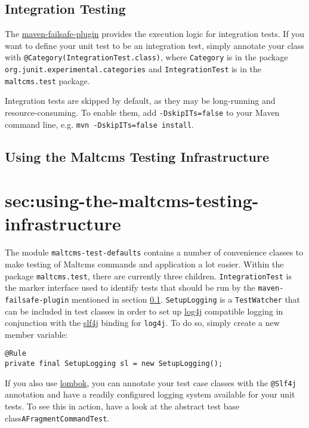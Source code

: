\subsection{Integration Testing}\label{sec:integration-testing}
The \href{http://maven.apache.org/plugins/maven-failsafe-plugin}{maven-failsafe-plugin} provides the execution logic for integration tests. If you want to define your unit test to be an integration test, simply 
annotate your class with \verb|@Category(IntegrationTest.class)|, where \verb|Category| is in the package \verb|org.junit.experimental.categories| and \verb|IntegrationTest| is in the \verb|maltcms.test| package.

Integration tests are skipped by default, as they may be long-running and resource-consuming. To enable them, add \verb|-DskipITs=false| to your Maven command line, e.g.
\verb|mvn -DskipITs=false install|. 

\subsection{Using the Maltcms Testing Infrastructure}\section{sec:using-the-maltcms-testing-infrastructure}
The module \verb|maltcms-test-defaults| contains a number of convenience classes to make testing of Maltcms commands and application a lot easier.
Within the package \verb|maltcms.test|, there are currently three children. \verb|IntegrationTest| is the marker interface used to identify tests that should be run 
by the \verb|maven-failsafe-plugin| mentioned in section \ref{sec:integration-testing}. \verb|SetupLogging| is a \verb|TestWatcher| that can be included in test classes in order to set up \href{http://logging.apache.org/log4j/1.2/}{log4j} compatible logging in conjunction with the \href{http://www.slf4j.org/}{slf4j} binding for \verb|log4j|. To do so, simply create a new member variable:
\begin{lstlisting}
@Rule
private final SetupLogging sl = new SetupLogging();
\end{lstlisting}
If you also use \href{http://projectlombok.org/}{lombok}, you can annotate your test case classes with the \verb|@Slf4j| annotation and have a 
readily configured logging system available for your unit tests. To see this in action, have a look at the abstract test base class\verb|AFragmentCommandTest|.